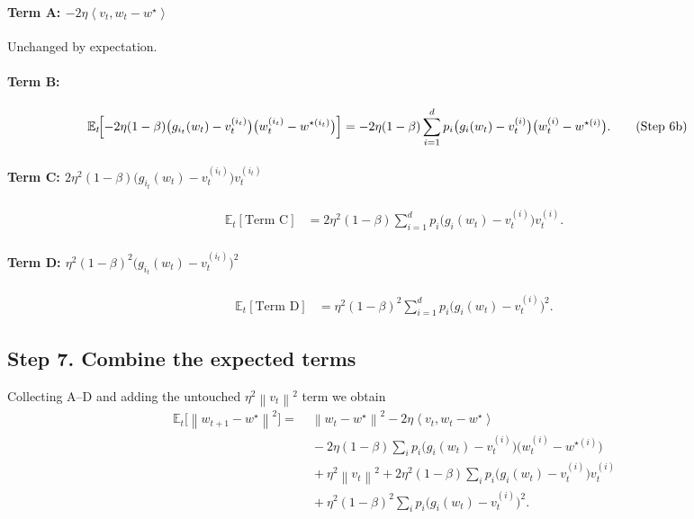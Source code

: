 \documentclass{article}
\newcommand{\E}{\mathbb{E}}
\newcommand{\norm}[1]{\left\|#1\right\|}
\newcommand{\ip}[2]{\left\langle #1,#2\right\rangle}
\begin{document}
\paragraph{Term A: $-2\eta\ip{v_t}{w_t-w^{\star}}$}
Unchanged by expectation.

\paragraph{Term B:}
\begin{align}
\E_t\!\Bigl[-2\eta(1-\beta)\bigl(g_{i_t}(w_t)-v_t^{(i_t)}\bigr)
\bigl(w_t^{(i_t)}-w^{\star (i_t)}\bigr)\Bigr]
&= -2\eta(1-\beta)\sum_{i=1}^{d}p_i\bigl(g_i(w_t)-v_t^{(i)}\bigr)
\bigl(w_t^{(i)}-w^{\star (i)}\bigr).
\tag{Step 6b}
\end{align}

\paragraph{Term C: $2\eta^{2}(1-\beta)\bigl(g_{i_t}(w_t)-v_t^{(i_t)}\bigr)v_t^{(i_t)}$}
\begin{align}
\E_t[\text{Term C}]
&=2\eta^{2}(1-\beta)\sum_{i=1}^{d}p_i\bigl(g_i(w_t)-v_t^{(i)}\bigr)v_t^{(i)}.
\tag{Step 6c}
\end{align}

\paragraph{Term D: $\eta^{2}(1-\beta)^{2}\bigl(g_{i_t}(w_t)-v_t^{(i_t)}\bigr)^{2}$}
\begin{align}
\E_t[\text{Term D}]
&=\eta^{2}(1-\beta)^{2}\sum_{i=1}^{d}p_i\bigl(g_i(w_t)-v_t^{(i)}\bigr)^{2}.
\tag{Step 6d}
\end{align}

\subsection*{Step 7.  Combine the expected terms}
Collecting A–D and adding the untouched $\eta^{2}\norm{v_t}^{2}$ term we obtain
\begin{align}
\E_t\!\bigl[\norm{w_{t+1}-w^{\star}}^{2}\bigr]
=&\;\norm{w_t-w^{\star}}^{2}
-2\eta\ip{v_t}{w_t-w^{\star}} \nonumber\\
&\; -2\eta(1-\beta)\sum_{i}p_i\bigl(g_i(w_t)-v_t^{(i)}\bigr)
\bigl(w_t^{(i)}-w^{\star (i)}\bigr) \nonumber\\
&\; +\eta^{2}\norm{v_t}^{2}
+2\eta^{2}(1-\beta)\sum_{i}p_i\bigl(g_i(w_t)-v_t^{(i)}\bigr)v_t^{(i)} \nonumber\\
&\; +\eta^{2}(1-\beta)^{2}\sum_{i}p_i\bigl(g_i(w_t)-v_t^{(i)}\bigr)^{2}.
\tag{Step 7}
\end{align}
\end{document}
